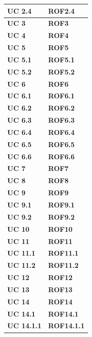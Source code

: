 \begin{longtable}{ |p{3cm}|p{3cm}|  }
    \textbf{UC 2.4}     & \textbf{ROF2.4}      \\ \hline
    \textbf{UC 3}       & \textbf{ROF3}        \\ \hline
    \textbf{UC 4}       & \textbf{ROF4}        \\ \hline
    \textbf{UC 5}       & \textbf{ROF5}        \\ \hline
    \textbf{UC 5.1}     & \textbf{ROF5.1}      \\ \hline
    \textbf{UC 5.2}     & \textbf{ROF5.2}      \\ \hline
    \textbf{UC 6}       & \textbf{ROF6}        \\ \hline
    \textbf{UC 6.1}     & \textbf{ROF6.1}      \\ \hline
    \textbf{UC 6.2}     & \textbf{ROF6.2}      \\ \hline
    \textbf{UC 6.3}     & \textbf{ROF6.3}      \\ \hline
    \textbf{UC 6.4}     & \textbf{ROF6.4}      \\ \hline
    \textbf{UC 6.5}     & \textbf{ROF6.5}      \\ \hline
    \textbf{UC 6.6}     & \textbf{ROF6.6}      \\ \hline
    \textbf{UC 7}       & \textbf{ROF7}        \\ \hline
    \textbf{UC 8}       & \textbf{ROF8}        \\ \hline
    \textbf{UC 9}       & \textbf{ROF9}        \\ \hline
    \textbf{UC 9.1}     & \textbf{ROF9.1}      \\ \hline
    \textbf{UC 9.2}     & \textbf{ROF9.2}      \\ \hline
    \textbf{UC 10}      & \textbf{ROF10}       \\ \hline
    \textbf{UC 11}      & \textbf{ROF11}       \\ \hline
    \textbf{UC 11.1}    & \textbf{ROF11.1}     \\ \hline
    \textbf{UC 11.2}    & \textbf{ROF11.2}     \\ \hline
    \textbf{UC 12}      & \textbf{ROF12}       \\ \hline
    \textbf{UC 13}      & \textbf{ROF13}       \\ \hline
    \textbf{UC 14}      & \textbf{ROF14}       \\ \hline
    \textbf{UC 14.1}    & \textbf{ROF14.1}     \\ \hline
    \textbf{UC 14.1.1}  & \textbf{ROF14.1.1}   \\ \hline

\end{longtable}
